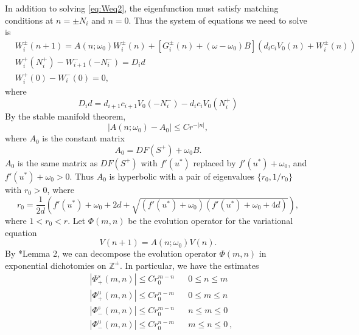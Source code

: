 \documentclass[12pt]{article}
\def\Z{{\mathbb Z}}
\begin{document}
In addition to solving \cref{eq:Weq2}, the eigenfunction must satisfy matching conditions at $n = \pm N_i$ and $n = 0$. Thus the system of equations we need to solve is
\begin{equation}\label{eq:eigWsystem1}
\begin{aligned}
& W_i^\pm(n+1)
= A(n; \omega_0) W_i^\pm(n) + [G_i^\pm(n) + (\omega - \omega_0) B](d_i c_i V_0(n) + W_i^\pm(n))\\
& W_i^+(N_i^+) - W_{i+1}^-(-N_i^-) = D_i d \\
& W_i^+(0) - W_i^-(0) = 0,
\end{aligned}
\end{equation}
where
\begin{equation}\label{defDid}
D_i d = d_{i+1} c_{i+1} V_0(-N_i^-) - d_i c_i V_0(N_i^+)
\end{equation}
By the stable manifold theorem, 
\begin{equation}\label{eq:A0decay}
	|A(n; \omega_0) - A_0| \leq C r^{-|n|},
\end{equation}
where $A_0$ is the constant matrix
\begin{equation}
	A_0 = DF(S^+) + \omega_0 B.
\end{equation}
$A_0$ is the same matrix as $DF(S^+)$ with $f'(u^*)$ replaced by $f'(u^*) + \omega_0$, and $f'(u^*) + \omega_0 > 0$. Thus $A_0$ is hyperbolic with a pair of eigenvalues $\{ r_0, 1/r_0 \}$ with $r_0 > 0$, where
\begin{equation}\label{eq:r0}
r_0 = \frac{1}{2d}\left( f'(u^*) + \omega_0 + 2d + \sqrt{(f'(u^*)+ \omega_0)(f'(u^*) + \omega_0 + 4d)} \right),
\end{equation}
where $1 < r_0 < r$. Let $\Phi(m, n)$ be the evolution operator for the variational equation 
\begin{equation}\label{eq:vareq1}
	V(n+1) = A(n; \omega_0) V(n).
\end{equation}
By \cite{Parker2020}*{Lemma 2}, we can decompose the evolution operator $\Phi(m, n)$ in exponential dichotomies on $\Z^\pm$. In particular, we have the estimates 
\begin{equation}\label{eq:dichotomyest}
\begin{aligned}
&|\Phi_+^s(m, n)| \leq C r_0^{m - n} && 0 \leq n \leq m \\
&|\Phi_+^u(m, n)| \leq C r_0^{n - m} && 0 \leq m \leq n \\
&|\Phi_-^s(m, n)| \leq C r_0^{m - n} && n \leq m \leq 0 \\
&|\Phi_-^u(m, n)| \leq C r_0^{n - m} && m \leq n \leq 0 \:,
\end{aligned}
\end{equation}
\end{document}
